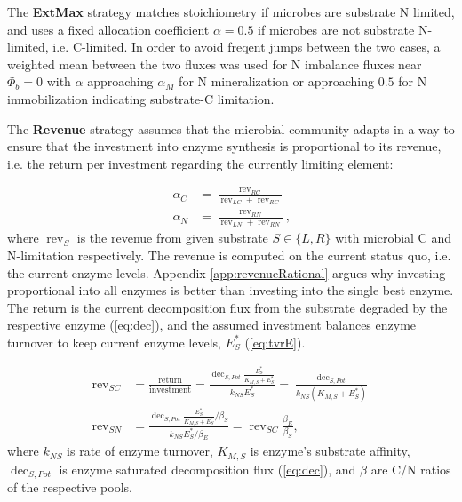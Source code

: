 The \textbf{ExtMax} strategy \citep{Averill14} matches stoichiometry if microbes
are substrate N limited, and uses a fixed allocation coefficient $\alpha = 0.5$
if microbes are not substrate N-limited, i.e. C-limited. In order to avoid
freqent jumps between the two cases, a weighted mean between the two fluxes was
used for N imbalance fluxes near $\Phi_b=0$ with $\alpha$ approaching $\alpha_M$
for N mineralization or approaching $0.5$ for N immobilization indicating
substrate-C limitation.

The \textbf{Revenue} strategy assumes that the microbial community adapts in a
way to ensure that the investment into enzyme synthesis is proportional to its
revenue, i.e.
the return per investment regarding the currently limiting element:

\begin{subequations}
\label{eq:allocRev}
\begin{align}
\alpha_C &= \frac{\operatorname{rev}_{RC}}{\operatorname{rev}_{LC} + \operatorname{rev}_{RC}} 
\\
\alpha_N &= \frac{\operatorname{rev}_{RN}}{\operatorname{rev}_{LN} + \operatorname{rev}_{RN}} 
\text{,} 
\end{align}
\end{subequations}
\noindent where $\operatorname{rev}_S$ is the revenue from given substrate $S \in \{L,R\}$
with microbial C and N-limitation respectively. The revenue is computed on the
current status quo, i.e. the current enzyme levels. Appendix
\ref{app:revenueRational} argues why investing proportional into all enzymes is
better than investing into the single best enzyme. The return is the current
decomposition flux from the substrate degraded by the respective enzyme
(\ref{eq:dec}), and the assumed investment balances enzyme turnover to keep
current enzyme levels, $E_S^*$ (\ref{eq:tvrE}).

\begin{subequations}
\label{eq:allocRev2}
\begin{align}
\operatorname{rev}_{SC} &= \frac{\text{return}}{\text{investment}} 
= \frac{\operatorname{dec}_{S,Pot} \frac{E_S^*}{K_{M,S} + E_S^*}} {k_{NS}E_S^*} 
= \frac{\operatorname{dec}_{S,Pot}} {k_{NS}(K_{M,S} + E_S^*)} 
\\ 
\operatorname{rev}_{SN} &= \frac{\operatorname{dec}_{S,Pot}
\frac{E_S^*}{K_{M,S} + E_S^*} / \beta_S} {k_{NS} E_S^* / \beta_E} 
= \operatorname{rev}_{SC} \frac{\beta_E}{\beta_S}
\text{,} 
\end{align}
\end{subequations} 
\noindent where $k_{NS}$ is rate of enzyme turnover, $K_{M,S}$ is enzyme's substrate
affinity, $\operatorname{dec}_{S,Pot}$ is
enzyme saturated decomposition flux (\ref{eq:dec}), and $\beta$ are C/N ratios
of the respective pools. 

